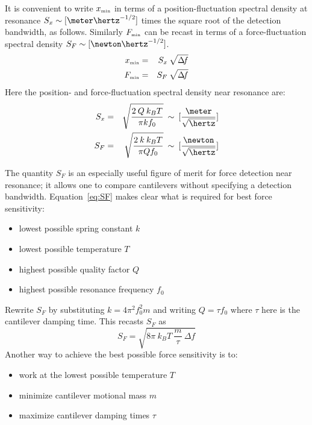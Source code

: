 It is convenient to write $x_{\mbox{\tiny min}}$ in terms of a
position-fluctuation spectral density at resonance $S_x \sim [\meter
\hertz^{-1/2}]$ times the square root of the detection bandwidth, as follows.  
Similarly $F_{\mbox{\tiny min}}$ can be recast in terms of a
force-fluctuation spectral density $S_F \sim [\newton \hertz^{-1/2}]$.
\begin{eqnarray}
x_{\mbox{\tiny min}} & = & S_x \: \sqrt{\Delta \! f} \\
F_{\mbox{\tiny min}} & = & S_F \: \sqrt{\Delta \! f}
\end{eqnarray}
Here the position- and force-fluctuation spectral density near resonance are:
\begin{eqnarray}
S_x & = & \sqrt{ \frac{2 \: Q \: k_B T}{\pi k f_0} } \: \sim \: [\frac{\meter}{\sqrt{\hertz}}] \\
S_F & = & \sqrt{ \frac{2 \: k \: k_B T}{\pi Q f_0} } \: \sim \: [\frac{\newton}{\sqrt{\hertz}}] \label{eq:SF}
\end{eqnarray}

The quantity $S_F$ is an especially useful figure of merit for force
detection near resonance; it allows one to compare cantilevers without
specifying a detection bandwidth.  Equation~\ref{eq:SF} makes clear
what is required for best force sensitivity:
\begin{itemize}
\item lowest possible spring constant $k$
\item lowest possible temperature $T$
\item highest possible quality factor $Q$
\item highest possible resonance frequency $f_0$
\end{itemize}

Rewrite $S_F$ by substituting $k = 4 \pi^2 f_0^2 m$ and writing $Q =
\tau f_0$ where $\tau$ here is the cantilever damping time.  This
recasts $S_F$ as
\begin{equation}
S_F = \sqrt{ 8 \pi \: k_B T \: \frac{m}{\tau} \: \Delta \! f}
\end{equation}
Another way to achieve the best possible force sensitivity is to:
\begin{itemize}
\item work at the lowest possible temperature $T$
\item minimize cantilever motional mass $m$
\item maximize cantilever damping times $\tau$
\end{itemize}


